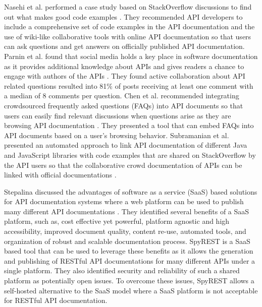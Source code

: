 \documentclass[conference]{IEEEtran}
\begin{document}
Nasehi et al. performed a case study based on StackOverflow discussions to find out what makes good code examples \cite{Nasehi_what_makes}. They recommended API developers to include a comprehensive set of code examples in the API documentation and the use of wiki-like collaborative tools with online API documentation so that users can ask questions and get answers on officially published API documentation. Parnin et al. found that social media holds a key place in software documentation as  it provides additional knowledge about APIs and gives readers a chance to engage with authors of the APIs \cite{Parnin_measuring}. They found active collaboration about API related questions resulted into 81\% of posts receiving at least one comment with a median of 8 comments per question. Chen et al. recommended integrating crowdsourced frequently asked questions (FAQs) into API documents so that users can easily find relevant discussions when questions arise as they are browsing API documentation \cite{Chen_who_asked}. They presented a tool that can embed FAQs into API documents based on a user's browsing behavior. Subramanian et al. presented an automated approach to link API documentation of different Java and JavaScript libraries with code examples that are shared on StackOverflow by the API users so that the collaborative crowd documentation of APIs can be linked with official documentations \cite{Subramanian_live}.

Stepalina discussed the advantages of software as a service (SaaS) based solutions for API documentation systems where a web platform can be used to publish many different API documentations \cite{Stepalina_saas}. They identified several benefits of a SaaS platform, such as, cost effective yet powerful, platform agnostic and high accessibility, improved document quality, content re-use, automated tools, and organization of robust and scalable documentation process. SpyREST is a SaaS based tool that can be used to leverage these benefits as it allows the generation and publishing of RESTful API documentations for many different APIs under a single platform. They also identified security and reliability of such a shared platform as potentially open issues. To overcome these issues, SpyREST allows a self-hosted alternative to the SaaS model where a SaaS platform is not acceptable for RESTful API documentation.
\end{document}
